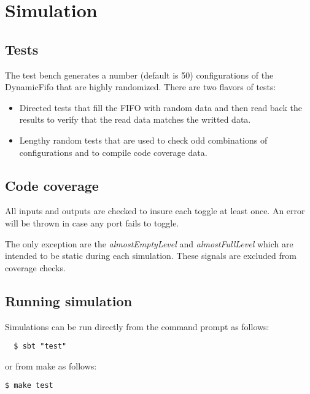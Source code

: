 \section{Simulation}

\subsection{Tests}
The test bench generates a number (default is 50) configurations of the
DynamicFifo that are highly randomized. There are two flavors of tests:

\begin{itemize}
  \item {Directed tests that fill the FIFO with random data and then read back
        the results to verify that the read data matches the writted data.}
  \item {Lengthy random tests that are used to check odd combinations of
        configurations and to compile code coverage data.}
\end{itemize}

\subsection{Code coverage}
All inputs and outputs are checked to insure each toggle at least once. An error
will be thrown in case any port fails to toggle.

The only exception are the \emph{almostEmptyLevel} and \emph{almostFullLevel}
which are intended to be static during each simulation. These signals are
excluded from coverage checks.

\subsection{Running simulation}

Simulations can be run directly from the command prompt as follows:

\begin{verbatim}
  $ sbt "test"
\end{verbatim}

or from make as follows:

\texttt{\$ make test}